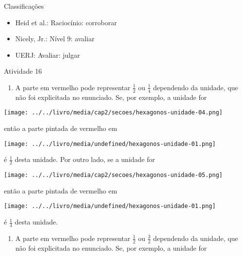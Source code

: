 \documentclass[oneside]{book}
\begin{document}
\begin{multicols}{2}
  Classificações
\begin{itemize} %
    \item       Heid et al.: Raciocínio: corroborar
    \item       Nicely, Jr.: Nível 9: avaliar
    \item       UERJ: Avaliar: julgar
\end{itemize} %


\begin{resposta*}{Atividade 16}
\begin{enumerate} [\quad a)] %
    \item       A parte em vermelho pode representar       $\frac{1}{2}$       ou       $\frac{1}{4}$       dependendo da unidade, que não foi explicitada no enunciado. Se, por exemplo, a unidade for
\end{enumerate} %
  \begin{imagem*}[breakable]{}{}             \texttt{[image: ../../livro/media/cap2/secoes/hexagonos-unidade-04.png]}  \end{imagem*}   então a parte pintada de vermelho em   \begin{imagem*}[breakable]{}{}             \texttt{[image: ../../livro/media/undefined/hexagonos-unidade-01.png]}  \end{imagem*}   é   $\frac{1}{2}$   desta unidade. Por outro lado,  se a unidade for   \begin{imagem*}[breakable]{}{}        \texttt{[image: ../../livro/media/cap2/secoes/hexagonos-unidade-05.png]}  \end{imagem*}   então a parte pintada de vermelho em   \begin{imagem*}[breakable]{}{}        \texttt{[image: ../../livro/media/undefined/hexagonos-unidade-01.png]}  \end{imagem*}   é   $\frac{1}{4}$   desta unidade.
\begin{enumerate} [\quad a)] %
    \item       A parte em vermelho pode representar       $\frac{1}{2}$       ou       $\frac{3}{2}$       dependendo da unidade, que não foi explicitada no enunciado. Se, por exemplo, a unidade for
\end{enumerate} %

\end{resposta*}
\end{multicols}
\end{document}
